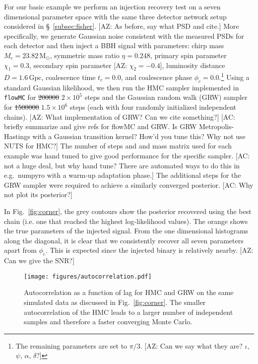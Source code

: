 \documentclass[twocolumn]{aastex631}
\newcommand{\flowMC}{\texttt{flowMC}\xspace}
\newcommand{\AZ}[1]{{\color{Burnt}[AZ: #1]}}
\newcommand{\amc}[1]{{\color{red}[AC: #1]}}
\begin{document}
For our basic example we perform an injection recovery test on a seven dimensional parameter space with the same three detector network setup considered in \S~\ref{subsec:fisher}.
\AZ{As before, say what PSD and cite.}
More specifically, we generate Gaussian noise consistent with the measured PSDs for each detector and then inject a BBH signal with parameters: chirp mass $M_c = 23.82\,\mathrm{M_\odot}$,  symmetric mass ratio $\eta = 0.248$, primary spin parameter $\chi_1=0.3$, secondary spin parameter \AZ{$\chi_2=-0.4$}, luminosity distance $D = 1.6\,\mathrm{Gpc}$, coalescence time $t_c = 0.0$, and coalescence phase $\phi_c = 0.0$.\footnote{
    The remaining parameters are set to $\pi/3$. \AZ{Can we say what they are? $\iota$, $\psi$, $\alpha$, $\delta$?}
}
Using a standard Gaussian likelihood, we then run the HMC sampler implemented in \flowMC for \sout{200000} $2\times10^5$ steps and the Gaussian random walk (GRW) sampler for \sout{1500000} $1.5\times10^6$ steps (each with four randomly initialized independent chains). 
\AZ{What implementation of GRW? Can we cite something?}
\amc{briefly summarize and give refs for flowMC and GRW. Is GRW Metropolis-Hastings with a Gaussian transition kernel? How'd you tune this? Why not use NUTS for HMC?}
The number of steps and and mass matrix used for each example was hand tuned to give good performance for the specific sampler.
\amc{not a huge deal, but why hand tune? There are automated ways to do this in e.g.\ numpyro with a warm-up adaptation phase.}
The additional steps for the GRW sampler were required to achieve a similarly converged posterior.
\amc{Why not plot its posterior?}

In Fig.~\ref{fig:corner}, the grey contours show the posterior recovered using the best chain (i.e. one that reached the highest log-likelihood values).
The orange shows the true parameters of the injected signal.
From the one dimensional histograms along the diagonal, it is clear that we consistently recover all seven parameters apart from $\phi_c$.
This is expected since the injected binary is relatively nearby.
\AZ{Can we give the SNR?}

\begin{figure}[t]
	\begin{centering}
		\texttt{[image: figures/autocorrelation.pdf]}
		\caption{
			Autocorrelation as a function of lag for HMC and GRW on the same simulated data as discussed in Fig.~\ref{fig:corner}.
            The smaller autocorrelation of the HMC leads to a larger number of independent samples and therefore a faster converging Monte Carlo.
		}
		\label{fig:autocorrelation}
	\end{centering}
\end{figure}
\end{document}
